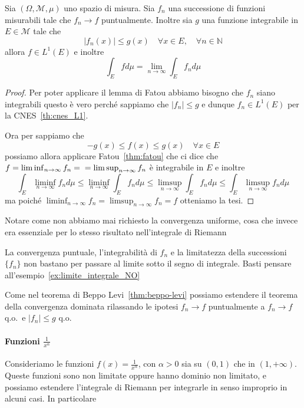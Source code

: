 \begin{theorem}\label{thm:Lebesgue_conv_dom}
    Sia \({(\Omega, \mathcal{M}, \mu)}\) uno spazio di misura. Sia \(f_{n}\) una
    successione di funzioni misurabili tale che \(f_{n} \to f\) puntualmente.
    Inoltre sia \(g\) una funzione integrabile in \(E \in \mathcal{M}\) tale che 
    \[
        |f_{n}{(x)}| \le g{(x)} \quad \forall x \in E, \quad \forall n \in \mathbb{N}
    \]
    allora \(f \in L^{1}{(E)}\) e inoltre
    \[
        \int_E f d\mu = \lim_{n \to \infty} \int_E f_{n} d\mu
    \]
\end{theorem}
\begin{proof}
    Per poter applicare il lemma di Fatou abbiamo bisogno che \(f_{n}\) siano
    integrabili questo è vero perché sappiamo che \(|f_{n}| \le g\) e dunque
    \(f_{n} \in L^{1}{(E)}\) per la CNES~\ref{th:cnes_L1}.

    Ora per sappiamo che
    \[
        -g{(x)} \le f{(x)} \le g{(x)} \quad \forall x \in E
    \]
    possiamo allora applicare Fatou~\ref{thm:fatou} che ci dice che \(f =
    \liminf_{n \to \infty} f_{n} = \\ = \limsup_{n \to \infty} f_{n} \) è integrabile
    in \(E\) e inoltre 
    \[
        \int_E \liminf_{n \to \infty} f_{n} d\mu \le \liminf_{n \to \infty} \int_E f_{n} d\mu \le \limsup_{n
        \to \infty} \int_E f_{n} d\mu \le \int_E \limsup_{n \to \infty}f_{n}  d\mu
    \]
    ma poiché \(\liminf_{n \to \infty} f_{n} = \limsup_{n \to \infty} f_{n} =
    f\) otteniamo la tesi.
\end{proof}
Notare come non abbiamo mai richiesto la convergenza uniforme, cosa che invece
era essenziale per lo stesso risultato nell'integrale di Riemann

\begin{note}
    La convergenza puntuale, l'integrabilità di \(f_{n}\) e la limitatezza della
    successioni \(\{f_{n}\} \)  non bastano per passare al limite sotto il segno
di integrale. Basti pensare all'esempio~\ref{ex:limite_integrale_NO}
\end{note}

\begin{remark}
    Come nel teorema di Beppo Levi~\ref{thm:beppo-levi} possiamo estendere il
    teorema della convergenza dominata rilassando le ipotesi \(f_{n} \to f\)
    puntualmente a \(f_{n} \to f\) q.o.~e \(|f_{n}| \le g\) q.o.
\end{remark}


\paragraph{Funzioni \(\frac{1}{x^{\alpha}}\)} Consideriamo le funzioni \(f{(x)}
= \frac{1}{x^{\alpha}}\), con \(\alpha>0\) sia su \((0,1)\) che in \({(1,
+\infty)}\). Queste funzioni sono non limitate oppure hanno dominio non
limitato, e possiamo estendere l'integrale di Riemann per integrarle in senso improprio in
alcuni casi. In particolare

